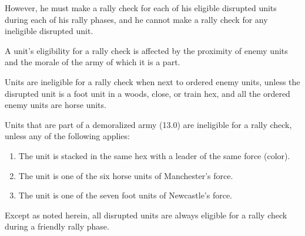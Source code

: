 However, he must make a rally check for each of his eligible disrupted units during each of his rally phases, and he cannot make a rally check for any ineligible disrupted unit.

 A unit's eligibility for a rally check is affected by the proximity of enemy units and the morale of the army of which it is a part.

\begin{tightitems}
  \item Units are ineligible for a rally check when next to ordered enemy units, unless the disrupted unit is a foot unit in a woods, close, or train hex, and all the ordered enemy units are horse units.
  \item Units that are part of a demoralized army (13.0) are ineligible for a rally check, unless any of the following applies:
    \begin{enumerate}[label=\Alph*.,leftmargin=1.4em,itemsep=.15em,topsep=.15em]
      \item The unit is stacked in the same hex with a leader of the same force (color).
      \item The unit is one of the six horse units of Manchester's force.
      \item The unit is one of the seven foot units of Newcastle's force.
    \end{enumerate}
\end{tightitems}

Except as noted herein, all disrupted units are always eligible for a rally check during a friendly rally phase.
